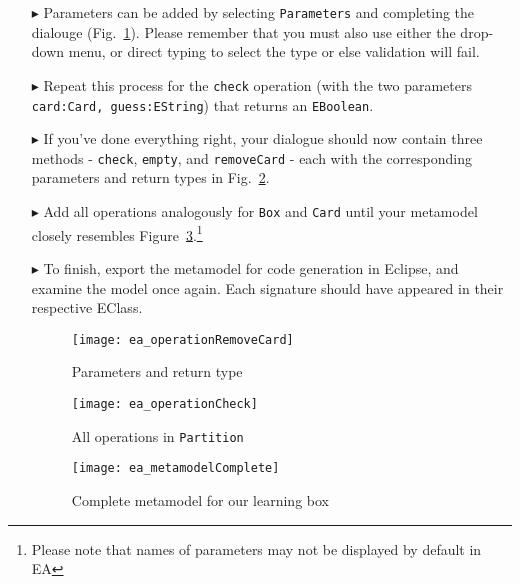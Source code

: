 \begin{enumerate}
\item[$\blacktriangleright$] Parameters can be added by selecting \texttt{Parameters} and
completing the dialouge (Fig.~\ref{ea:operation_parameters}). Please remember that you must also use either the drop-down menu, or direct typing to select the type or else validation
will fail.

\item[$\blacktriangleright$] Repeat this process for the \texttt{check} operation (with the two parameters \texttt{card:Card, guess:EString}) that returns an \texttt{EBoolean}. 

\item[$\blacktriangleright$] If you've done everything right, your dialogue should now contain three methods - \texttt{check}, \texttt{empty}, and
\texttt{removeCard} - each with the corresponding parameters and return types in Fig.~\ref{ea:operation_partition}.


\item[$\blacktriangleright$] Add all operations analogously for \texttt{Box} and \texttt{Card} until your metamodel closely resembles
Figure~\ref{ea:metamodel_complete}.\footnote{Please note that names of parameters may not be displayed by default in EA}

\item[$\blacktriangleright$] To finish, export the metamodel for code generation in Eclipse, and examine the model once again. Each signature should have
appeared in their respective EClass.

\newpage

\vspace*{1cm}

\begin{figure}[htbp]
	\centering
  \texttt{[image: ea\_operationRemoveCard]}
	\caption{Parameters and return type}
	\label{ea:operation_parameters}
\end{figure}

\vspace{1cm}

\begin{figure}[h!]
	\centering
  \texttt{[image: ea\_operationCheck]}
	\caption{All operations in \texttt{Partition}}
	\label{ea:operation_partition}
\end{figure}

\newpage


\begin{figure}[htbp]
	\centering
  \texttt{[image: ea\_metamodelComplete]}
\caption[Complete metamodel for our learning box.]{Complete metamodel for our learning box}
	\label{ea:metamodel_complete}
\end{figure}
\FloatBarrier

\end{enumerate}

